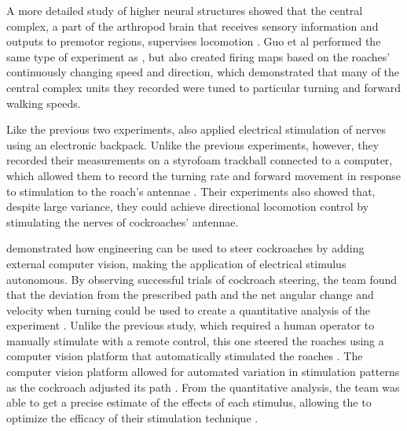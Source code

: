 \documentclass[twocolumn,10pt]{IEEEtran}
\begin{document}
A more detailed study of higher neural structures showed that the central complex, a part of the arthropod brain that receives sensory information and outputs to premotor regions, supervises locomotion \cite{guo2013neural}. Guo et al \cite{guo2013neural} performed the same type of experiment as \cite{moore1998directed}, but also created firing maps based on the roaches' continuously changing speed and direction, which demonstrated that many of the central complex units they recorded were tuned to particular turning and forward walking speeds.

Like the previous two experiments, \cite{holzer1997locomotion} also applied electrical stimulation of nerves using an electronic backpack. Unlike the previous experiments, however, they recorded their measurements on a styrofoam trackball connected to a computer, which allowed them to record the turning rate and forward movement in response to stimulation to the roach's antennae \cite{holzer1997locomotion}. Their experiments also showed that, despite large variance, they could achieve directional locomotion control by stimulating the nerves of cockroaches' antennae.

\cite{whitmire2013kinect} demonstrated how engineering can be used to steer cockroaches by adding external computer vision, making the application of electrical stimulus autonomous. By observing successful trials of cockroach steering, the team found that the deviation from the prescribed path and the net angular change and velocity when turning could be used to create a quantitative analysis of the experiment \cite{whitmire2013kinect}. Unlike the previous study, which required a human operator to manually stimulate with a remote control, this one steered the roaches using a computer vision platform that automatically stimulated the roaches \cite{whitmire2013kinect}. The computer vision platform allowed for automated variation in stimulation patterns as the cockroach adjusted its path \cite{whitmire2013kinect}. From the quantitative analysis, the team was able to get a precise estimate of the effects of each stimulus, allowing the to optimize the efficacy of their stimulation technique \cite{whitmire2013kinect}. 
\end{document}
